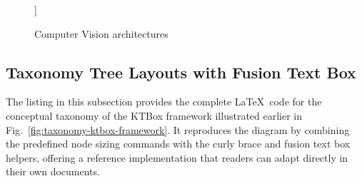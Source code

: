 \documentclass[12pt,onecolumn]{article}
\begin{document}
\begin{ktbox}[theme=gray]
\begin{codeblock}
\begin{figure*}[h]
{\begin{forest}
          [\ktwrapboxm{Attention Mechanisms\\{\color{ktorange-bg-dark}\scriptsize(2018--2023)}}, fill=ktorange-bg]
          [\ktwrapboxm{ViTs, VLMs, vision LLMs (vLLMs)\\{\color{ktorange-bg-dark}\scriptsize(2021--2025)}}, fill=ktorange-bg]
        ]
      \end{forest}
    }
    \caption[Computer Vision architectures]{Computer Vision architectures}
    \label{fig:taxonomy-architectures}
  \end{figure*}
\end{codeblock}
    \end{ktbox}

  \subsection{Taxonomy Tree Layouts with Fusion Text Box}
  \label{sec:taxonomy-tree-layouts-with-fusion-text-box}
    The listing in this subsection provides the complete \LaTeX\ code for the conceptual taxonomy of the KTBox framework illustrated earlier in Fig.~\ref{fig:taxonomy-ktbox-framework}. It reproduces the diagram by combining the predefined node sizing commands with the curly brace and fusion text box helpers, offering a reference implementation that readers can adapt directly in their own documents.
\end{document}
